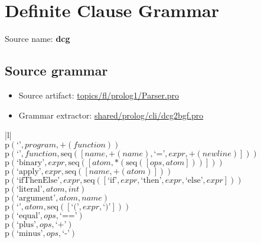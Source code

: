 \chapter{Definite Clause Grammar}

 Source name: \textbf{dcg}

\section{Source grammar}

\begin{itemize}
\item Source artifact: \href{http://github.com/grammarware/slps/blob/master/topics/fl/prolog1/Parser.pro}{topics/fl/prolog1/Parser.pro}
\item Grammar extractor: \href{http://github.com/grammarware/slps/blob/master/shared/prolog/cli/dcg2bgf.pro}{shared/prolog/cli/dcg2bgf.pro}
\end{itemize}

\footnotesize\begin{center}\begin{tabular}{|l|}\hline
{}
\\\hline
$\mathrm{p}(\text{`'},\mathit{program},{+}\left(\mathit{function}\right))$	\\
$\mathrm{p}(\text{`'},\mathit{function},\mathrm{seq}\left(\left[\mathit{name}, {+}\left(\mathit{name}\right), \text{`='}, \mathit{expr}, {+}\left(\mathit{newline}\right)\right]\right))$	\\
$\mathrm{p}(\text{`binary'},\mathit{expr},\mathrm{seq}\left(\left[\mathit{atom}, {*}\left(\mathrm{seq}\left(\left[\mathit{ops}, \mathit{atom}\right]\right)\right)\right]\right))$	\\
$\mathrm{p}(\text{`apply'},\mathit{expr},\mathrm{seq}\left(\left[\mathit{name}, {+}\left(\mathit{atom}\right)\right]\right))$	\\
$\mathrm{p}(\text{`ifThenElse'},\mathit{expr},\mathrm{seq}\left(\left[\text{`if'}, \mathit{expr}, \text{`then'}, \mathit{expr}, \text{`else'}, \mathit{expr}\right]\right))$	\\
$\mathrm{p}(\text{`literal'},\mathit{atom},\mathit{int})$	\\
$\mathrm{p}(\text{`argument'},\mathit{atom},\mathit{name})$	\\
$\mathrm{p}(\text{`'},\mathit{atom},\mathrm{seq}\left(\left[\text{`('}, \mathit{expr}, \text{`)'}\right]\right))$	\\
$\mathrm{p}(\text{`equal'},\mathit{ops},\text{`=='})$	\\
$\mathrm{p}(\text{`plus'},\mathit{ops},\text{`+'})$	\\
$\mathrm{p}(\text{`minus'},\mathit{ops},\text{`-'})$	\\
\hline\end{tabular}\end{center}

